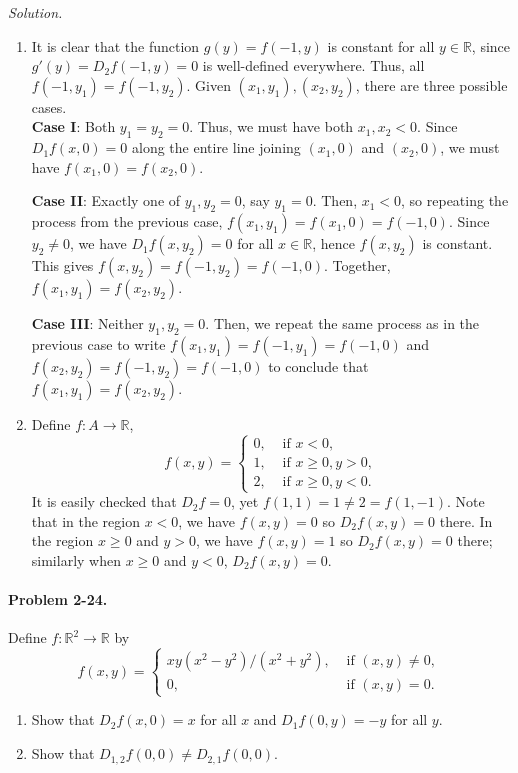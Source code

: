 \documentclass[11pt]{report}
\newcommand{\R}{\mathbb{R}}
\newcommand{\problem}[1]{\paragraph{Problem #1.}}
\newcommand{\solution}{\noindent\textit{Solution.} }
\begin{document}
    \solution \begin{enumerate}
        \item It is clear that the function $g(y) = f(-1, y)$ is constant for all $y
        \in \R$, since $g'(y) = D_2f(-1, y) = 0$ is well-defined everywhere. Thus,
        all $f(-1, y_1) = f(-1, y_2)$. Given $(x_1, y_1), (x_2, y_2)$, there are
        three possible cases. \\

        \textbf{Case I}: Both $y_1 = y_2 = 0$. Thus, we must have both $x_1, x_2 <
        0$. Since $D_1f(x, 0) = 0$ along the entire line joining $(x_1, 0)$ and
        $(x_2, 0)$, we must have $f(x_1, 0) = f(x_2, 0)$.

        \textbf{Case II}: Exactly one of $y_1, y_2 = 0$, say $y_1 = 0$. Then, $x_1 <
        0$, so repeating the process from the previous case, $f(x_1, y_1) = f(x_1, 0)
        = f(-1, 0)$.  Since $y_2 \neq 0$, we have $D_1f(x, y_2) = 0$ for all $x \in
        \R$, hence $f(x, y_2)$ is constant. This gives $f(x, y_2) = f(-1, y_2) =
        f(-1, 0)$. Together, $f(x_1, y_1) = f(x_2, y_2)$.

        \textbf{Case III}: Neither $y_1, y_2 = 0$. Then, we repeat the same process
        as in the previous case to write $f(x_1, y_1) = f(-1, y_1) = f(-1, 0)$ and
        $f(x_2, y_2) = f(-1, y_2) = f(-1, 0)$ to conclude that $f(x_1, y_1) = f(x_2,
        y_2)$.


        \item Define $f\colon A \to \R$, \[
            f(x, y) = \begin{cases}
                0, &\text{ if } x < 0, \\
                1, &\text{ if } x \geq 0, y > 0, \\
                2, &\text{ if } x \geq 0, y < 0.
            \end{cases}
        \] It is easily checked that $D_2f = 0$, yet $f(1, 1) = 1 \neq 2 = f(1, -1)$.
        Note that in the region $x < 0$, we have $f(x, y) = 0$ so $D_2f(x, y) = 0$
        there. In the region $x \geq 0$ and $y > 0$, we have $f(x, y) = 1$ so
        $D_2f(x, y) = 0$ there; similarly when $x \geq 0$ and $y < 0$, $D_2f(x, y) =
        0$.
    \end{enumerate} 


    \problem{2-24} Define $f\colon \R^2 \to \R$ by \[
        f(x, y) = \begin{cases}
            xy(x^2 - y^2)/(x^2 + y^2), &\text{ if } (x, y) \neq 0, \\
            0, &\text{ if } (x, y) = 0.
        \end{cases}
    \] 
    \begin{enumerate}
        \item Show that $D_2f(x, 0) = x$ for all $x$ and $D_1f(0, y) = -y$ for all
        $y$.
        \item Show that $D_{1, 2}f(0, 0) \neq D_{2, 1}f(0, 0)$.
    \end{enumerate}
\end{document}
